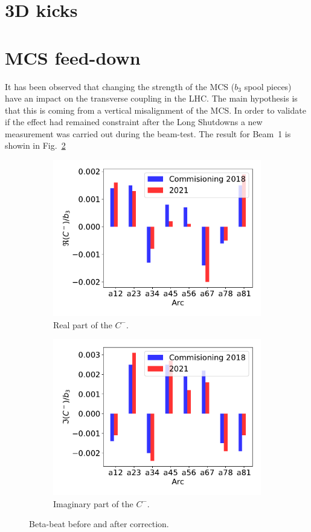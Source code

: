 \documentclass[a4paper]{cernatsnote}
\begin{document}
\section{3D kicks}

\section{MCS feed-down}
It has been observed that changing the strength of the MCS ($b_3$ spool pieces) have an impact on the transverse coupling in the LHC. The main hypothesis is that this is coming from a vertical misalignment of the MCS. In order to validate if the effect had remained constraint after the Long Shutdowns a new measurement was carried out during the beam-test. The result for Beam~1 is showin in Fig.~\ref{}

\begin{figure}[ht]
\begin{subfigure}{.5\textwidth}
  \centering
  \includegraphics[width=.8\linewidth]{plots/MCS/b_1change_re_per_b3.pdf}  
  \caption{Real part of the $C^-$. }
  \label{fig:sub-first}
\end{subfigure}
\begin{subfigure}{.5\textwidth}
  \centering
  \includegraphics[width=.8\linewidth]{plots/MCS/b_1change_im_per_b3.pdf}  
  \caption{Imaginary part of the $C^-$.}
  \label{fig:sub-second}
\end{subfigure}
\caption{Beta-beat before and after correction.}
\label{fig:fig}
\end{figure}
\end{document}
